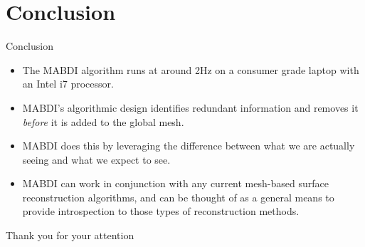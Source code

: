 \section{Conclusion}

\begin{frame}{Conclusion} %
  \begin{itemize}[<+->]
    \item The MABDI algorithm runs at around 2Hz on a consumer grade laptop with
    an Intel i7 processor.
    \item MABDI's algorithmic design identifies redundant information and removes it
    \emph{before} it is added to the global mesh.
    \item MABDI does this by leveraging the difference between what we are
    actually seeing and what we expect to see.
    \item MABDI can work in conjunction with any current mesh-based surface
    reconstruction algorithms, and can be thought of as a general means to
    provide introspection to those types of reconstruction methods.
  \end{itemize}


\end{frame}

\begin{frame}[plain] %
  \begin{center}
    {\LARGE Thank you for your attention}
  \end{center}
\end{frame}
